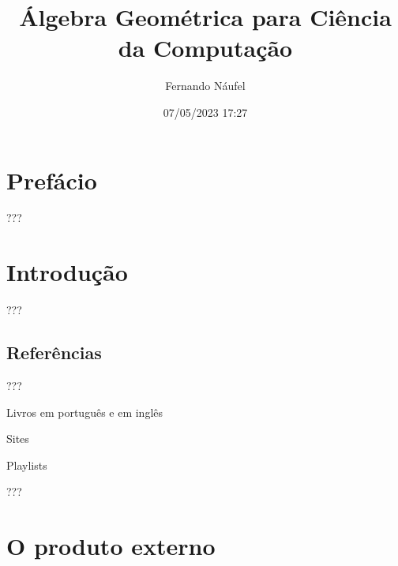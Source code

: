 \documentclass[
  letterpaper,
  DIV=11,
  numbers=noendperiod]{scrreprt}
\title{Álgebra Geométrica para Ciência da Computação}
\author{Fernando Náufel}
\date{07/05/2023 17:27}
\renewcommand*\contentsname{Índice}
\newcommand\contentsname{Índice}
\begin{document}
\maketitle


\ifdefined\Shaded\renewenvironment{Shaded}{\begin{tcolorbox}[enhanced, borderline west={3pt}{0pt}{shadecolor}, frame hidden, sharp corners, interior hidden, boxrule=0pt, breakable]}{\end{tcolorbox}}\fi

\renewcommand*\contentsname{Índice}
{
\hypersetup{linkcolor=}
\setcounter{tocdepth}{2}
\tableofcontents
}
\providecommand{\reais}{\mathbb{R}}
\providecommand{\sen}{\text{sen}\,}
\providecommand{\vet}[1]{\mathbf{#1}}
\providecommand{\biv}[1]{\mathbf{#1}}
\providecommand{\ve}[1]{\vet{e}_{#1}}

\hypertarget{prefuxe1cio}{%
\chapter*{Prefácio}\label{prefuxe1cio}}

???

\hypertarget{sec-intro}{%
\chapter{Introdução}\label{sec-intro}}

???

\hypertarget{referuxeancias}{%
\section{Referências}\label{referuxeancias}}

???

Livros em português e em inglês

Sites

Playlists

???

\providecommand{\reais}{\mathbb{R}}
\providecommand{\sen}{\text{sen}\,}
\providecommand{\vet}[1]{\mathbf{#1}}
\providecommand{\biv}[1]{\mathbf{#1}}
\providecommand{\ve}[1]{\vet{e}_{#1}}

\hypertarget{sec-prod-ext}{%
\chapter{O produto externo}\label{sec-prod-ext}}
\end{document}
